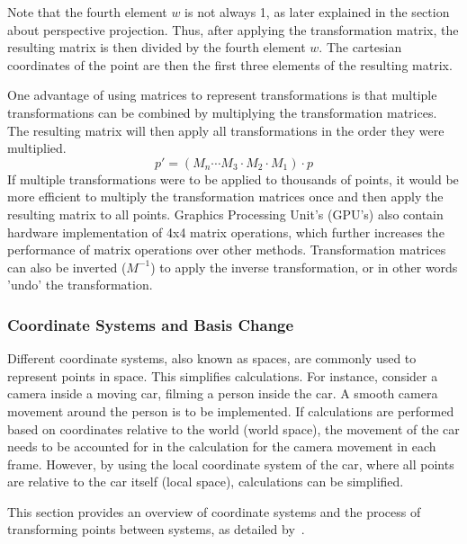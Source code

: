 Note that the fourth element $w$ is not always 1, as later explained in the section about perspective projection.
Thus, after applying the transformation matrix, the resulting matrix is then divided by the fourth element $w$.
The cartesian coordinates of the point are then the first three elements of the resulting matrix.

One advantage of using matrices to represent transformations is that multiple transformations can be combined by
multiplying the transformation matrices.
The resulting matrix will then apply all transformations in the order they were multiplied.
\begin{equation}
    p' = (M_n \cdots M_3 \cdot M_2 \cdot M_1) \cdot p
\end{equation}
If multiple transformations were to be applied to thousands of points,
it would be more efficient to multiply the transformation matrices once and then apply the resulting matrix to all points.
Graphics Processing Unit's (GPU's) also contain hardware implementation of 4x4 matrix operations,
which further increases the performance of matrix operations over other methods.
Transformation matrices can also be inverted ($M^{-1}$) to apply the inverse transformation, or in other words 'undo' the transformation.

\subsubsection{Coordinate Systems and Basis Change}

Different coordinate systems, also known as spaces, are commonly used to represent points in space.
This simplifies calculations.
For instance, consider a camera inside a moving car, filming a person inside the car.
A smooth camera movement around the person is to be implemented.
If calculations are performed based on coordinates relative to the world (world space),
the movement of the car needs to be accounted for in the calculation for the camera movement in each frame.
However, by using the local coordinate system of the car, where all points are relative to the car itself (local space),
calculations can be simplified.

This section provides an overview of coordinate systems and the process of transforming points between systems, as detailed by~\cite{dorner_virtual_2019}.

